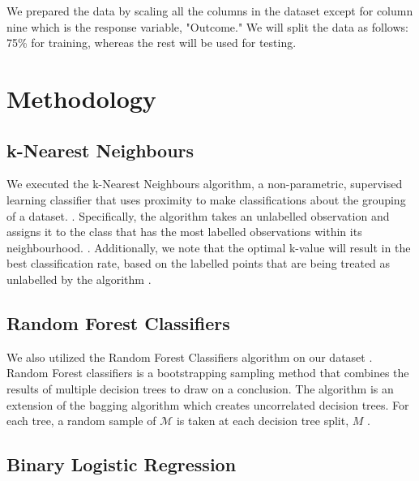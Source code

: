 \documentclass[12pt]{article}
\begin{document}
\begin{indent}
\onehalfspacing
	
We prepared the data by scaling all the columns in the dataset except for column nine which is the response variable, "Outcome." We will split the data as follows: 75\% for training, whereas the rest will be used for testing.
\end{indent}

\section{Methodology}
 
\subsection{k-Nearest Neighbours}

\indent
\onehalfspacing

We executed the k-Nearest Neighbours algorithm, a non-parametric, supervised learning classifier that uses proximity to make classifications about the grouping of a dataset. \citep{peterson2009k}. Specifically, the algorithm takes an unlabelled observation and assigns it to the class that has the most labelled observations within its neighbourhood. \citep{Lecture14}. Additionally, we note that the optimal k-value will result in the best classification rate, based on the labelled points that are being treated as unlabelled by the algorithm \citep{Lecture14}.

 \subsection{Random Forest Classifiers}
 
\indent
\onehalfspacing

We also utilized the Random Forest Classifiers algorithm on our dataset \citep{zhou2012ensemble}. Random Forest classifiers is a bootstrapping sampling method that combines the results of multiple decision trees to draw on a conclusion. The algorithm is an extension of the bagging algorithm which creates uncorrelated decision trees. For each tree, a random sample of $\mathcal{M}$ is taken at each decision tree split, $M$ \citep{Lecture16}.

\subsection{Binary Logistic Regression}
\end{document}
